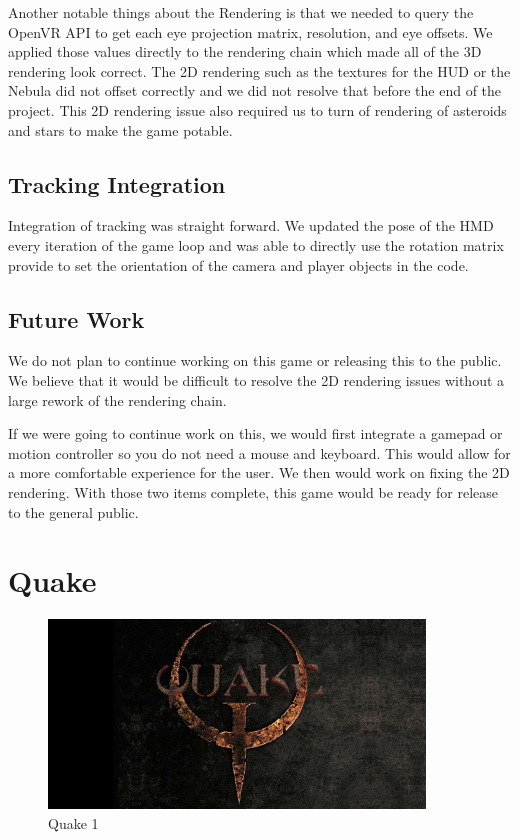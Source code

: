 \documentclass[journal]{IEEEtran}
\begin{document}
Another notable things about the Rendering is that we needed to query the OpenVR API to get each eye projection matrix, resolution, and eye offsets. We applied those values directly to the rendering chain which made all of the 3D rendering look correct. The 2D rendering such as the textures for the HUD or the Nebula did not offset correctly and we did not resolve that before the end of the project. This 2D rendering issue also required us to turn of rendering of asteroids and stars to make the game potable. 

\subsection{Tracking Integration}
Integration of tracking was straight forward. We updated the pose of the HMD every iteration of the game loop and was able to directly use the rotation matrix provide to set the orientation of the camera and player objects in the code. 


\subsection{Future Work}
We do not plan to continue working on this game or releasing this to the public. We believe that it would be difficult to resolve the 2D rendering issues without a large rework of the rendering chain. 

If we were going to continue work on this, we would first integrate a gamepad or motion controller so you do not need a mouse and keyboard. This would allow for a more comfortable experience for the user. We then would work on fixing the 2D rendering. With those two items complete, this game would be ready for release to the general public.  


\section{Quake}

\begin{figure}[h]
	\includegraphics[width=10cm]{QuakeHeader} 
	\centering
	\caption{Quake 1\cite{quake_header} \label{fig:quake}}
\end{figure}
\end{document}
